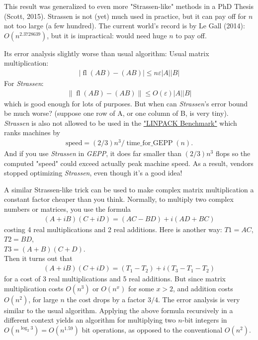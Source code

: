 \documentclass[11pt]{article}
\numberwithin{equation}{section}
\begin{document}
This result was generalized to even more "Strassen-like" methods in a PhD Thesis (Scott, 2015). Strassen is not (yet) much used in practice, but it can pay off for $n$ not too large (a few hundred).
The current world's record is by Le Gall (2014): $O(n^{2.3728639})$, but it is impractical: would need huge $n$ to pay off.

Its error analysis slightly worse than usual algorithm: Usual matrix multiplication: \begin{align*}
    |\operatorname{fl}(AB) - (AB)| \leq n \varepsilon|A||B|
\end{align*}
For \textit{Strassen}: \begin{align*}
    \|\operatorname{fl}(AB) - (AB)\| \leq O(\varepsilon) |A||B|
\end{align*} which is good enough for lots of purposes. But when can \textit{Strassen}'s error bound be much worse?
(suppose one row of A, or one column of B, is very tiny).
\textit{Strassen} is also not allowed to be used in the \href{www.top500.org}{"LINPACK Benchmark"} which ranks machines by \begin{align*}
    \mathrm{speed} = (2/3)n^3 / \operatorname{time\_for\_GEPP}(n).
\end{align*}
And if you use \textit{Strassen} in \textit{GEPP}, it does far smaller than $(2/3)n^3$ flops so the computed "speed" could exceed actually peak machine speed. 
As a result, vendors stopped optimizing \textit{Strassen}, even though it's a good idea!

A similar Strassen-like trick can be used to make complex matrix multiplication a constant factor cheaper than you think. Normally,
to multiply two complex numbers or matrices, you use the formula \begin{align*}
    (A+iB)(C+iD) = (AC-BD)+i(AD+BC)
\end{align*}
costing 4 real multiplications and 2 real additions. Here is another way:
$T1 = AC$,\\
$T2 = BD$,\\
$T3 = (A+B)(C+D)$.\\
Then it turns out that \begin{align*}
    (A+iB)(C+iD) = (T_1 - T_2) + i(T_3 - T_1 - T_2)
\end{align*}
for a cost of 3 real multiplications and 5 real additions. But since matrix multiplication costs $O(n^3)$ or $O(n^x)$ for some $x>2$,
and addition costs $O(n^2)$, for large $n$ the cost drops by a factor $3/4$. The error analysis is very similar to the usual algorithm.
Applying the above formula recursively in a different context yields an algorithm for multiplying two $n$-bit integers in
$O(n^{\log_2 3}) = O(n^{1.59})$ bit operations, as opposed to the conventional $O(n^2)$.
\end{document}
